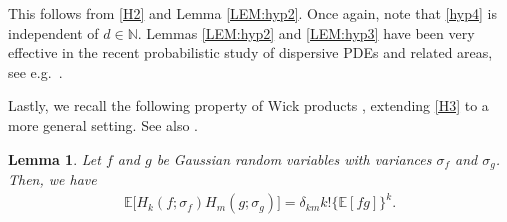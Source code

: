\documentclass[letterpaper, 11pt,  reqno]{amsart}
\newtheorem{lemma}[theorem]{Lemma}
\newcommand{\1}{\hspace{0.5mm}\text{I}\hspace{0.5mm}}
\newcommand{\E}{\mathbb{E}}
\newcommand{\dl}{\delta}
\newcommand{\s}{\sigma}
\newcommand{\N}{\mathbb{N}}
\numberwithin{equation}{section}
\numberwithin{theorem}{section}
\begin{document}
This  follows from \eqref{H2}
and Lemma \ref{LEM:hyp2}.
Once again, note that \eqref{hyp4} is independent of $d \in \N$.
Lemmas \ref{LEM:hyp2} and \ref{LEM:hyp3}
have been very effective
in the recent probabilistic study of dispersive PDEs
and related areas, see e.g.~\cite{Tzv, TTz, Benyi, CO,  BTT1}.


Lastly, we recall the following property of Wick products \cite[Theorem I.3]{Simon},
extending \eqref{H3} to a more general setting.
See also \cite[Lemma 1.1.1]{Nu}.

\begin{lemma}\label{LEM:Wick}
Let $f$ and $g$ be Gaussian random variables with variances $\s_f$
and $\s_g$.
Then, we have 
\begin{align*}
\E\big[ H_k(f; \s_f) H_m(g; \s_g)\big] = \dl_{km} k! \big\{\E[ f g] \big\}^k.
\end{align*}
\end{lemma}
\end{document}
